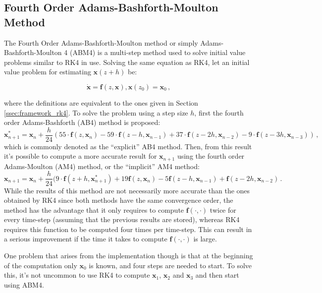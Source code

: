 \subsection{Fourth Order Adams-Bashforth-Moulton Method} \label{add:abm4}
The Fourth Order Adams-Bashforth-Moulton method or simply Adams-Bashforth-Moulton 4 (ABM4) is a multi-step method used to solve initial value problems similar to RK4 in use.
Solving the same equation as RK4, let an initial value problem for estimating $\mathbf{x}(z+h)$ be:

    \begin{equation*}
        \mathbf{\dot{x}} = \mathbf{f}(z,\mathbf{x}), \mathbf{x}(z_0) = \mathbf{x}_0\,,
    \end{equation*}

where the definitions are equivalent to the ones given in Section \ref{ssec:framework_rk4}.
To solve the problem using a step size $h$, first the fourth order Adams-Bashforth (AB4) method is proposed:
    \begin{equation}
        \label{eq:abm4_explicit} \mathbf{x}_{n+1}^* = \mathbf{x}_n + \frac{h}{24} (55\cdot \mathbf{f}(z, \mathbf{x}_n) - 59\cdot \mathbf{f}(z-h, \mathbf{x}_{n-1}) + 37\cdot \mathbf{f}(z-2h, \mathbf{x}_{n-2}) - 9\cdot \mathbf{f}(z-3h, \mathbf{x}_{n-3}))\,,
    \end{equation}
which is commonly denoted as the ``explicit'' AB4 method.
Then, from this result it's possible to compute a more accurate result for $\mathbf{x}_{n+1}$ using the fourth order Adams-Moulton (AM4) method, or the ``implicit'' AM4 method:
    \begin{equation}
        \label{eq:abm4_implicit} \mathbf{x}_{n+1} = \mathbf{x}_n + \frac{h}{24} (9\cdot \mathbf{f}(z+h, \mathbf{x}_{n+1}^*) + 19\mathbf{f}(z,\mathbf{x}_n) - 5\mathbf{f}(z-h,\mathbf{x}_{n-1}) + \mathbf{f}(z-2h,\mathbf{x}_{n-2})\,.
    \end{equation}
While the results of this method are not necessarily more accurate than the ones obtained by RK4 since both methods have the same convergence order, %
the method has the advantage that it only requires to compute $\mathbf{f}(\cdot,\cdot)$ twice for every time-step (assuming that the previous results are stored), whereas RK4 requires this function to be computed four times per time-step.
This can result in a serious improvement if the time it takes to compute $\mathbf{f}(\cdot,\cdot)$ is large.

One problem that arises from the implementation though is that at the beginning of the computation only $\mathbf{x}_0$ is known, and four steps are needed to start.
To solve this, it's not uncommon to use RK4 to compute $\mathbf{x}_1$, $\mathbf{x}_2$ and $\mathbf{x}_3$ and then start using ABM4.